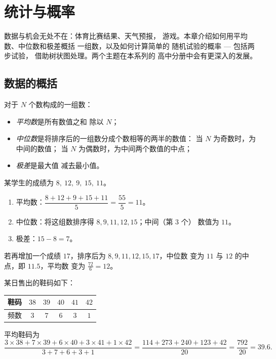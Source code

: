 \chapter{统计与概率}\label{ch:g9:statproba}

数据与机会无处不在：体育比赛结果、天气预报，
游戏。本章介绍如何用平均数、中位数和极差概括
一组数，以及如何计算简单的
随机试验的概率 --- 包括两步试验，
借助树状图处理。两个主题在本系列的
高中分册中会有更深入的发展。

\section{数据的概括}

\begin{definition}\label{def:g9:statproba:indicators}
对于 $N$ 个数构成的一组数：
\begin{itemize}
  \item \emph{平均数}是所有数值之和
        除以 $N$；
  \item \emph{中位数}是将排序后的一组数分成个数相等的两半的数值：
        当 $N$ 为奇数时，为中间的数值；
        当 $N$ 为偶数时，为中间两个数值的中点；
  \item \emph{极差}是最大值
        减去最小值。
\end{itemize}
\end{definition}

\begin{example}\label{ex:g9:statproba:indicators}
某学生的成绩为 $8,\ 12,\ 9,\ 15,\ 11$。
\begin{enumerate}
  \item 平均数：$\dfrac{8 + 12 + 9 + 15 + 11}{5} = \dfrac{55}{5} = 11$。
  \item 中位数：将这组数排序得 $8, 9, 11, 12, 15$；中间（第 3 个）
        数值为 $11$。
  \item 极差：$15 - 8 = 7$。
\end{enumerate}
若再增加一个成绩 $17$，排序后为 $8, 9, 11, 12, 15, 17$，中位数
变为 $11$ 与 $12$ 的中点，即 $11.5$，平均数
变为 $\frac{72}{6} = 12$。
\end{example}

\begin{example}[加权平均数]\label{ex:g9:statproba:weighted}
某日售出的鞋码如下：
\begin{center}
\renewcommand{\arraystretch}{1.2}
\begin{tabular}{c|ccccc}
鞋码 & $38$ & $39$ & $40$ & $41$ & $42$ \\
\hline
频数 & $3$ & $7$ & $6$ & $3$ & $1$ \\
\end{tabular}
\end{center}
平均鞋码为
\[
\frac{3 \times 38 + 7 \times 39 + 6 \times 40 + 3 \times 41 + 1 \times 42}
{3 + 7 + 6 + 3 + 1}
= \frac{114 + 273 + 240 + 123 + 42}{20}
= \frac{792}{20} = 39.6 .
\]
\end{example}


